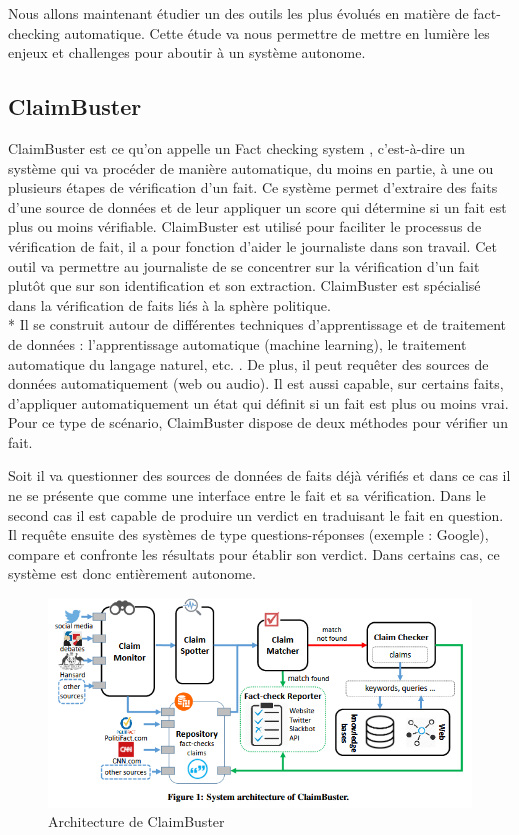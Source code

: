 Nous allons maintenant étudier un des outils les plus évolués en matière de fact-checking automatique. Cette étude va nous permettre de mettre en lumière les enjeux et challenges pour aboutir à un système autonome.

\subsection{ClaimBuster} 

ClaimBuster est ce qu'on appelle un Fact checking system \cite{hassan2015quest}, c'est-à-dire un système qui va procéder de manière automatique, du moins en partie, à une ou plusieurs étapes de vérification d'un fait. Ce système permet d'extraire des faits d'une source de données et de leur appliquer un score qui détermine si un fait est plus ou moins vérifiable. ClaimBuster est utilisé pour faciliter le processus de vérification de fait, il a pour fonction d'aider le journaliste dans son travail. Cet outil va permettre au journaliste de se concentrer sur la vérification d'un fait plutôt que sur son identification et son extraction. ClaimBuster est spécialisé dans la vérification de faits liés à la sphère politique.
\\*
Il se construit autour de différentes techniques d'apprentissage et de traitement de données : l'apprentissage automatique (machine learning), le traitement automatique du langage naturel, etc. \cite{hassan2017claimbuster}.
De plus, il peut requêter des sources de données automatiquement (web ou audio). Il est aussi capable, sur certains faits, d'appliquer automatiquement un état qui définit si un fait est plus ou moins vrai. Pour ce type de scénario, ClaimBuster dispose de deux méthodes pour vérifier un fait. 

Soit il va questionner des sources de données de faits déjà vérifiés et dans ce cas il ne se présente que comme une interface entre le fait et sa vérification. Dans le second cas il est capable de produire un verdict en traduisant le fait en question. Il requête ensuite des systèmes de type questions-réponses (exemple : Google), compare et confronte les résultats pour établir son verdict. Dans certains cas, ce système est donc entièrement autonome.

\begin{figure}[ht]
\centering
\includegraphics[width=\textwidth, draft=false]{imgs/claimbuster.PNG}
\caption{Architecture de ClaimBuster}
\label{claimbuster}
\end{figure}

